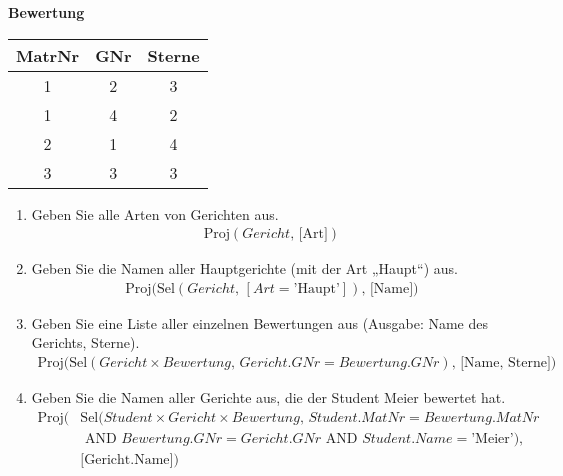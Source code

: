 \begin{table}[H]
\begin{minipage}[t]{0.3\textwidth}
        \centering
        \textbf{Bewertung} \\ [3pt]
        \begin{tabular}{|c|c|c|}
            \hline
            \textbf{MatrNr} & \textbf{GNr} & \textbf{Sterne} \\
            \hline
            1 & 2    & 3 \\
            1 & 4    & 2 \\
            2 & 1    & 4\\
            3 & 3    & 3 \\
            \hline
        \end{tabular}
    \end{minipage}
\end{table}

\begin{enumerate}
    \item Geben Sie alle Arten von Gerichten aus.
        \begin{align*}
            \text{Proj}(Gericht,\, \text{[Art]})
        \end{align*}

    \item Geben Sie die Namen aller Hauptgerichte (mit der Art „Haupt“) aus.
        \begin{align*}
            \text{Proj}\bigl(
            \text{Sel}(Gericht,\,[Art=\text{'Haupt'}]),\, \text{[Name]}
            \bigr)
        \end{align*}

    \item Geben Sie eine Liste aller einzelnen Bewertungen aus (Ausgabe: Name des Gerichts, Sterne).
        \begin{align*}
            \text{Proj}\bigl(
            \text{Sel}(Gericht \times Bewertung,\, Gericht.GNr = Bewertung.GNr),\, \text{[Name, Sterne]}
            \bigr)
        \end{align*}

    \item Geben Sie die Namen aller Gerichte aus, die der Student Meier bewertet hat.
        \begin{align*}
            \text{Proj}\bigl(&
            \text{Sel}(Student \times Gericht \times Bewertung,\, Student.MatNr = Bewertung.MatNr \\
            &\text{ AND } Bewertung.GNr = Gericht.GNr \text{ AND } Student.Name=\text{'Meier'}),\, \\
            &\text{[Gericht.Name]}
            \bigr)
        \end{align*}


\end{enumerate}
